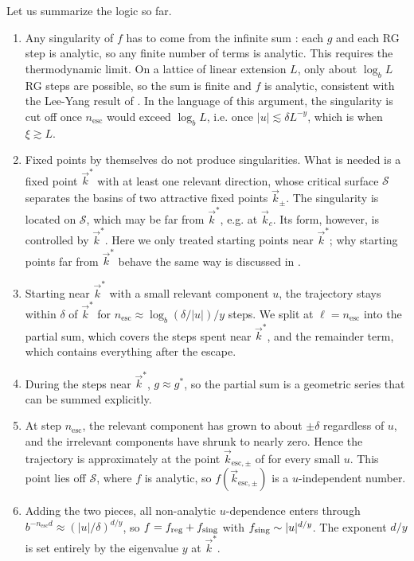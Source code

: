 Let us summarize the logic so far.
\begin{enumerate}
\item Any singularity of $f$ has to come from the infinite sum
: each $g$ and each RG step is analytic, so any
finite number of terms is analytic. This requires the thermodynamic limit. On a
lattice of linear extension $L$, only about $\log_bL$ RG steps are possible, so
the sum is finite and $f$ is analytic, consistent with the Lee-Yang result of
. In the language of this argument, the singularity is cut off once
$n_\text{esc}$ would exceed $\log_bL$, i.e. once $|u|\lesssim\delta L^{-y}$,
which is when $\xi\gtrsim L$.
\item Fixed points by themselves do not produce singularities. What is needed is
a fixed point $\vec{k}^*$ with at least one relevant direction, whose critical
surface $\mathcal{S}$ separates the basins of two attractive fixed points
$\vec{k}_\pm$. The singularity is located on $\mathcal{S}$, which may be far from
$\vec{k}^*$, e.g. at $\vec{k}_c$. Its form, however, is controlled by
$\vec{k}^*$. Here we only treated starting points near $\vec{k}^*$; why starting
points far from $\vec{k}^*$ behave the same way is discussed in
.
\item Starting near $\vec{k}^*$ with a small relevant component $u$, the
trajectory stays within $\delta$ of $\vec{k}^*$ for
$n_\text{esc}\approx\log_b(\delta/|u|)/y$ steps. We split
 at $\ell=n_\text{esc}$ into the
partial sum, which covers the steps spent near $\vec{k}^*$, and the remainder
term, which contains everything after the escape.
\item During the steps near $\vec{k}^*$, $g\approx g^*$, so the partial sum is a
geometric series that can be summed explicitly.
\item At step $n_\text{esc}$, the relevant component has grown to about
$\pm\delta$ regardless of $u$, and the irrelevant components have shrunk to
nearly zero. Hence the trajectory is approximately at the point
$\vec{k}_{\text{esc},\pm}$ of  for every small $u$. This
point lies off $\mathcal{S}$, where $f$ is analytic, so
$f(\vec{k}_{\text{esc},\pm})$ is a $u$-independent number.
\item Adding the two pieces, all non-analytic $u$-dependence enters through
$b^{-n_\text{esc}d}\approx(|u|/\delta)^{d/y}$, so $f=f_\text{reg}+f_{\text{sing}}$ with
$f_{\text{sing}}\sim|u|^{d/y}$. The exponent $d/y$ is set entirely by the eigenvalue $y$
at $\vec{k}^*$.
\end{enumerate}

